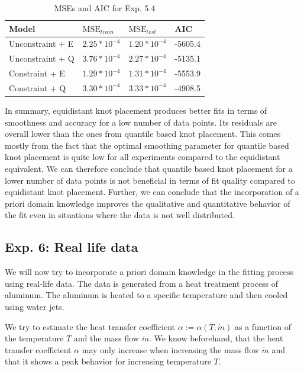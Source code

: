 \documentclass[10pt,a4paper]{article}
\begin{document}
\begin{table}[H]
	\centering
	\begin{tabular}{|l|l|l|l|}
		\hline
		\textbf{Model} & \textbf{$\text{MSE}_{train}$} & \textbf{$\text{MSE}_{test}$}  & \textbf{AIC} \\ \hline \toprule
		Unconstraint + E  & $2.25 * 10^{-4}$  & $1.20 * 10^{-4}$ & -5605.4       \\ \hline
		Unconstraint + Q  & $3.76 * 10^{-4}$  & $2.27 * 10^{-4}$ & -5135.1      \\ \hline
		Constraint + E    & $1.29 * 10^{-4}$  & $1.31 * 10^{-4}$ & -5553.9      \\ \hline
		Constraint + Q    & $3.30 * 10^{-4}$  & $3.33 * 10^{-4}$ & -4908.5     \\ \hline \bottomrule
	\end{tabular}
	\caption{MSEs and AIC for Exp. 5.4}
	\label{tab:metrics_54}
\end{table}


In summary, equidistant knot placement produces better fits in terms of smoothness and accuracy for a low number of data points. Its residuals are overall lower than the ones from quantile based knot placement. This comes mostly from the fact that the optimal smoothing parameter for quantile based knot placement is quite low for all experiments compared to the equidistant equivalent. We can therefore conclude that quantile based knot placement for a lower number of data points is not beneficial in terms of fit quality compared to equidistant knot placement. Further, we can conclude that the incorporation of a priori domain knowledge improves the qualitative and quantitative behavior of the fit even in situations where the data is not well distributed.  


\subsection{Exp. 6: Real life data} \label{subsec:real-life-data}

We will now try to incorporate a priori domain knowledge in the fitting process using real-life data. The data is generated from a heat treatment process of aluminum. The aluminum is heated to a specific temperature and then cooled using water jets.

We try to estimate the heat transfer coefficient $\alpha := \alpha(T, \dot m)$ as a function of the temperature $T$ and the mass flow $\dot m$. We know beforehand, that the heat transfer coefficient $\alpha$ may only increase when increasing the mass flow $\dot m$ and that it shows a peak behavior for increasing temperature $T$. 
\end{document}
